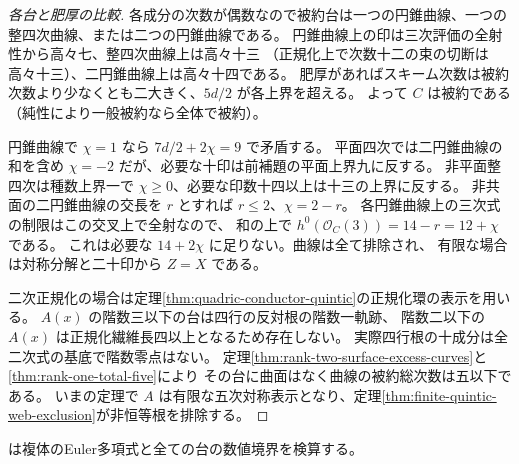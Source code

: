 \begin{proof}[各台と肥厚の比較]
各成分の次数が偶数なので被約台は一つの円錐曲線、一つの整四次曲線、または二つの円錐曲線である。
円錐曲線上の印は三次評価の全射性から高々七、整四次曲線上は高々十三
（正規化上で次数十二の束の切断は高々十三）、二円錐曲線上は高々十四である。
肥厚があればスキーム次数は被約次数より少なくとも二大きく、$5d/2$ が各上界を超える。
よって $C$ は被約である（純性により一般被約なら全体で被約）。

円錐曲線で $\chi=1$ なら $7d/2+2\chi=9$ で矛盾する。
平面四次では二円錐曲線の和を含め $\chi=-2$ だが、必要な十印は前補題の平面上界九に反する。
非平面整四次は種数上界一で $\chi\ge0$、必要な印数十四以上は十三の上界に反する。
非共面の二円錐曲線の交長を $r$ とすれば $r\le2$、$\chi=2-r$。
各円錐曲線上の三次式の制限はこの交叉上で全射なので、
和の上で $h^0(\mathcal O_C(3))=14-r=12+\chi$ である。
これは必要な $14+2\chi$ に足りない。曲線は全て排除され、
有限な場合は対称分解と二十印から $Z=X$ である。

二次正規化の場合は定理\ref{thm:quadric-conductor-quintic}の正規化環の表示を用いる。
$A(x)$ の階数三以下の台は四行の反対根の階数一軌跡、
階数二以下の $A(x)$ は正規化繊維長四以上となるため存在しない。
実際四行根の十成分は全二次式の基底で階数零点はない。
定理\ref{thm:rank-two-surface-excess-curves}と\ref{thm:rank-one-total-five}により
その台に曲面はなく曲線の被約総次数は五以下である。
いまの定理で $A$ は有限な五次対称表示となり、定理\ref{thm:finite-quintic-web-exclusion}が非恒等根を排除する。
\end{proof}
 は複体のEuler多項式と全ての台の数値境界を検算する。
